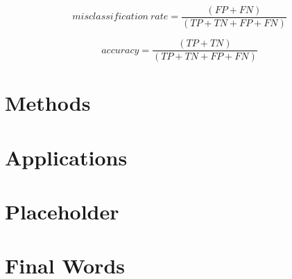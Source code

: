 \documentclass[]{book}
\begin{document}
\begin{equation}
  misclassification\ rate=\frac{(FP+FN)}{(TP+TN+FP+FN)}
  \label{eq:math-misclassification-rate}
\end{equation}

\begin{equation}
  accuracy=\frac{(TP+TN)}{(TP+TN+FP+FN)}
  \label{eq:math-accuracy}
\end{equation}

\chapter{Methods}\label{methods}

\chapter{Applications}\label{applications}

\chapter{Placeholder}\label{placeholder}

\chapter{Final Words}\label{final-words}


\end{document}
